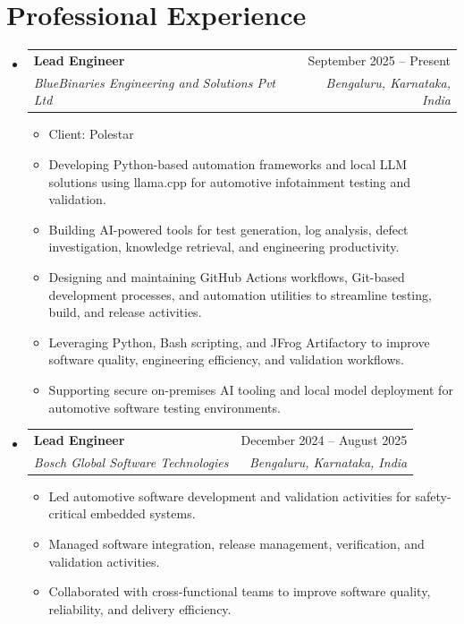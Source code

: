 \documentclass[11pt,a4paper]{article}
\makeatletter
\newcommand{\resumeItem}[1]{\item\small{#1}}
\newcommand{\resumeSubheading}[4]{
  \vspace{-1pt}\item
    \begin{tabular*}{\textwidth}{l@{\extracolsep{\fill}}r}
      \textbf{#1} & #2 \\
      \textit{\small#3} & \textit{\small #4} \\
    \end{tabular*}\vspace{-5pt}
}
\makeatother
\begin{document}
\section{Professional Experience}

\begin{itemize}[leftmargin=0.15in]

\resumeSubheading
{Lead Engineer}{September 2025 -- Present}
{BlueBinaries Engineering and Solutions Pvt Ltd}{Bengaluru, Karnataka, India}
\vspace{4pt}
\begin{itemize}
    \resumeItem{Client: Polestar}
    \vspace{10pt}
    \resumeItem{Developing Python-based automation frameworks and local LLM solutions using llama.cpp for automotive infotainment testing and validation.}
    \resumeItem{Building AI-powered tools for test generation, log analysis, defect investigation, knowledge retrieval, and engineering productivity.}
    \resumeItem{Designing and maintaining GitHub Actions workflows, Git-based development processes, and automation utilities to streamline testing, build, and release activities.}
    \resumeItem{Leveraging Python, Bash scripting, and JFrog Artifactory to improve software quality, engineering efficiency, and validation workflows.}
    \resumeItem{Supporting secure on-premises AI tooling and local model deployment for automotive software testing environments.}
\end{itemize}
\vspace{10pt}

\resumeSubheading
{Lead Engineer}{December 2024 -- August 2025}
{Bosch Global Software Technologies}{Bengaluru, Karnataka, India}
\vspace{4pt}
\begin{itemize}
    \resumeItem{Led automotive software development and validation activities for safety-critical embedded systems.}
    \resumeItem{Managed software integration, release management, verification, and validation activities.}
    \resumeItem{Collaborated with cross-functional teams to improve software quality, reliability, and delivery efficiency.}
\end{itemize}
\vspace{10pt}


\end{itemize}
\end{document}
